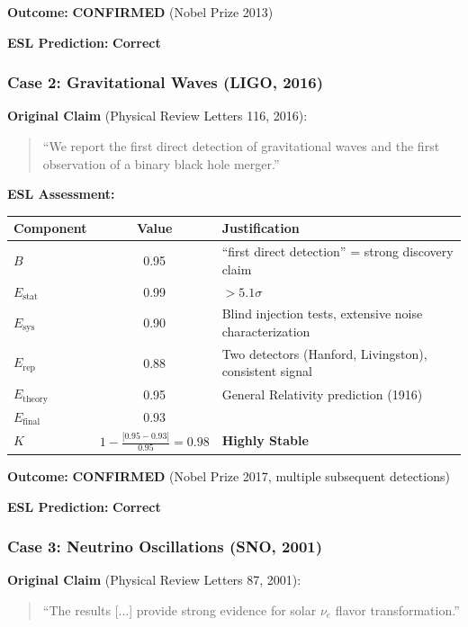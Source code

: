 \documentclass[11pt,a4paper]{article}
\begin{document}
\textbf{Outcome:} \textcolor{green!60!black}{\textbf{CONFIRMED}} (Nobel Prize 2013)

\textbf{ESL Prediction:} \checkmark \textbf{Correct}

\subsubsection{Case 2: Gravitational Waves (LIGO, 2016)}

\textbf{Original Claim} (Physical Review Letters 116, 2016):
\begin{quote}
``We report the first direct detection of gravitational waves and the first observation of a binary black hole merger.''
\end{quote}

\textbf{ESL Assessment:}
\begin{center}
\begin{tabular}{lcl}
\toprule
\textbf{Component} & \textbf{Value} & \textbf{Justification} \\
\midrule
$B$ & 0.95 & ``first direct detection'' = strong discovery claim \\
$E_{\text{stat}}$ & 0.99 & $>5.1\sigma$ \\
$E_{\text{sys}}$ & 0.90 & Blind injection tests, extensive noise characterization \\
$E_{\text{rep}}$ & 0.88 & Two detectors (Hanford, Livingston), consistent signal \\
$E_{\text{theory}}$ & 0.95 & General Relativity prediction (1916) \\
\midrule
$E_{\text{final}}$ & 0.93 & \\
\midrule
$K$ & $1 - \frac{|0.95 - 0.93|}{0.95} = 0.98$ & \textbf{Highly Stable} \\
\bottomrule
\end{tabular}
\end{center}

\textbf{Outcome:} \textcolor{green!60!black}{\textbf{CONFIRMED}} (Nobel Prize 2017, multiple subsequent detections)

\textbf{ESL Prediction:} \checkmark \textbf{Correct}

\subsubsection{Case 3: Neutrino Oscillations (SNO, 2001)}

\textbf{Original Claim} (Physical Review Letters 87, 2001):
\begin{quote}
``The results [...] provide strong evidence for solar $\nu_e$ flavor transformation.''
\end{quote}
\end{document}
